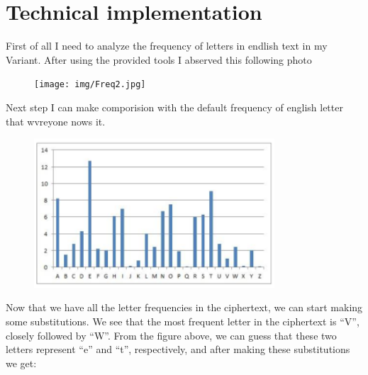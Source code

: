 \documentclass[12pt]{article}
\begin{document}
\section*{Technical implementation}
\hspace{0.8cm}
First of all I need to analyze the frequency of letters in endlish text in my Variant. After using the provided tools I abserved this following photo
\begin{figure}[h!]
    \centering
    \texttt{[image: img/Freq2.jpg]}
    \label{fig:result1}
\end{figure}

Next step I can make comporision with the default frequency of english letter that wvreyone nows it. 

\begin{figure}[h!]
    \centering
    \includegraphics[width=0.8\textwidth]{img/def.png}
    \label{fig:result1}
\end{figure}

Now that we have all the letter frequencies in the ciphertext, we can start making some
substitutions. We see that the most frequent letter in the ciphertext is “V”, closely followed by “W”.
From the figure above, we can guess that these two letters represent “e” and
“t”, respectively, and after making these substitutions we get:
\end{document}
